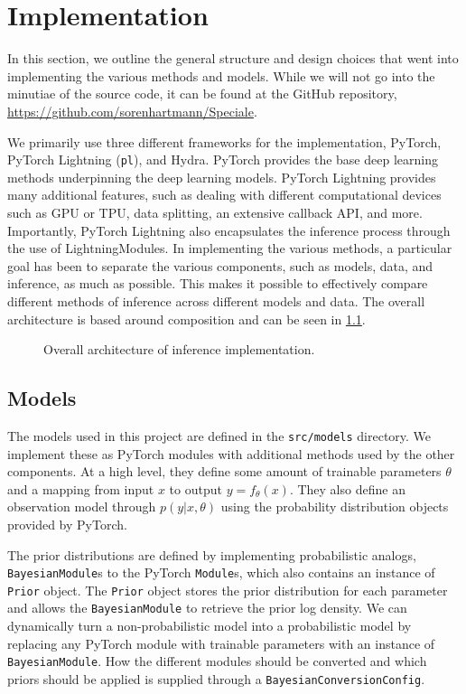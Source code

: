 \chapter{Implementation}


In this section, we outline the general structure and design choices that went into implementing the various methods and models. 
While we will not go into the minutiae of the source code, it can be found at the GitHub repository, \url{https://github.com/sorenhartmann/Speciale}.

We primarily use three different frameworks for the implementation, PyTorch, PyTorch Lightning (\texttt{pl}), and Hydra.
PyTorch provides the base deep learning methods underpinning the deep learning models. 
PyTorch Lightning provides many additional features, such as dealing with different computational devices such as GPU or TPU, data splitting, an extensive callback API, and more.
Importantly, PyTorch Lightning also encapsulates the inference process through the use of LightningModules.
In implementing the various methods, a particular goal has been to separate the various components, such as models, data, and inference, as much as possible.  
This makes it possible to effectively compare different methods of inference across different models and data.
The overall architecture is based around composition and can be seen in \cref{fig:sw-arch}.
\begin{figure}[htbp]
    \centering
    
    \caption{Overall architecture of inference implementation. }
    \label{fig:sw-arch}
\end{figure}

\section{Models}
The models used in this project are defined in the \texttt{src/models} directory.
We implement these as PyTorch modules with additional methods used by the other components. 
At a high level, they define some amount of trainable parameters $\theta$ and a mapping from input $x$ to output $y=f_\theta(x)$. 
They also define an observation model through $p(y|x, \theta)$ using the probability distribution objects provided by PyTorch.

The prior distributions are defined by implementing probabilistic analogs, \texttt{BayesianModule}s to the PyTorch \texttt{Module}s, which also contains an instance of \texttt{Prior} object. 
The \texttt{Prior} object stores the prior distribution for each parameter and allows the \texttt{BayesianModule} to retrieve the prior log density. 
We can dynamically turn a non-probabilistic model into a probabilistic model by replacing any PyTorch module with trainable parameters with an instance of \texttt{BayesianModule}.
How the different modules should be converted and which priors should be applied is supplied through a \texttt{BayesianConversionConfig}.

